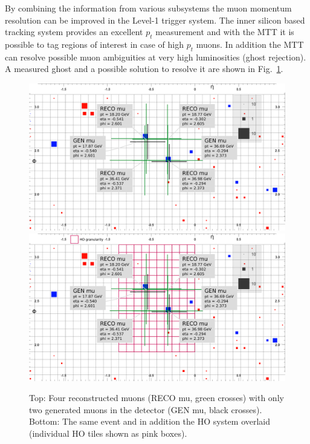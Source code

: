 By combining the information from various subsystems the muon momentum resolution can be improved in the Level-1 trigger system. The inner silicon based tracking system provides 
an excellent $p_t$ measurement and with the MTT it is possible to tag regions of interest in case of high $p_t$ muons. In addition the MTT can resolve possible muon 
ambiguities at very high luminosities (ghost rejection). A measured ghost and a possible solution to resolve it are shown in Fig.~\ref{fig:ghosts}.
\begin{figure}[htbp]
\centering
\includegraphics[width=\textwidth]{Figures/pooth/GhostEvent01.png}
\includegraphics[width=\textwidth]{Figures/pooth/GhostEvent02.png}
\caption{Top: Four reconstructed muons (RECO mu, green crosses) with only two generated muons in the detector (GEN mu, black crosses). 
Bottom: The same event and in addition the HO system overlaid (individual HO tiles shown as pink boxes).} 
\label{fig:ghosts}
\end{figure}

\clearpage
